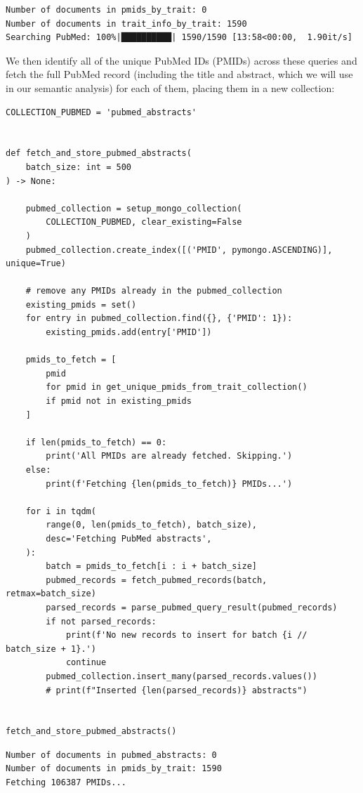 \begin{lstlisting}[style=shell, numbers=none]
Number of documents in pmids_by_trait: 0
Number of documents in trait_info_by_trait: 1590
Searching PubMed: 100%|██████████| 1590/1590 [13:58<00:00,  1.90it/s]
\end{lstlisting}

We then identify all of the unique PubMed IDs (PMIDs) across these queries and fetch the full PubMed record (including the title and abstract, which we will use in our semantic analysis) for each of them, placing them in a new collection:

\begin{lstlisting}[style=Python]
COLLECTION_PUBMED = 'pubmed_abstracts'


def fetch_and_store_pubmed_abstracts(
    batch_size: int = 500
) -> None:

    pubmed_collection = setup_mongo_collection(
        COLLECTION_PUBMED, clear_existing=False
    )
    pubmed_collection.create_index([('PMID', pymongo.ASCENDING)], unique=True)

    # remove any PMIDs already in the pubmed_collection
    existing_pmids = set()
    for entry in pubmed_collection.find({}, {'PMID': 1}):
        existing_pmids.add(entry['PMID'])

    pmids_to_fetch = [
        pmid
        for pmid in get_unique_pmids_from_trait_collection()
        if pmid not in existing_pmids
    ]

    if len(pmids_to_fetch) == 0:
        print('All PMIDs are already fetched. Skipping.')
    else:
        print(f'Fetching {len(pmids_to_fetch)} PMIDs...')

    for i in tqdm(
        range(0, len(pmids_to_fetch), batch_size),
        desc='Fetching PubMed abstracts',
    ):
        batch = pmids_to_fetch[i : i + batch_size]
        pubmed_records = fetch_pubmed_records(batch, retmax=batch_size)
        parsed_records = parse_pubmed_query_result(pubmed_records)
        if not parsed_records:
            print(f'No new records to insert for batch {i // batch_size + 1}.')
            continue
        pubmed_collection.insert_many(parsed_records.values())
        # print(f"Inserted {len(parsed_records)} abstracts")


fetch_and_store_pubmed_abstracts()
\end{lstlisting}

\begin{lstlisting}[style=shell, numbers=none]
Number of documents in pubmed_abstracts: 0
Number of documents in pmids_by_trait: 1590
Fetching 106387 PMIDs...
\end{lstlisting}

